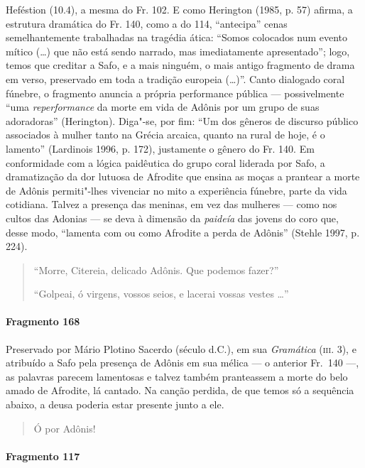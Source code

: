 {Heféstion (10.4), a mesma do Fr. 102. E como Herington (1985, p. 57) afirma, a estrutura dramática do Fr. 140,  como a do 114, “antecipa” cenas semelhantemente trabalhadas na tragédia ática: “Somos colocados num evento mítico (\ldots{}) que não está sendo narrado, mas imediatamente apresentado”; logo,  temos que creditar a Safo, e a mais ninguém, o mais antigo fragmento de drama em verso, preservado em toda a tradição europeia (\ldots{})”. Canto dialogado coral fúnebre, o fragmento anuncia a própria performance pública --- possivelmente “uma \textit{reperformance} da morte em vida de Adônis por um grupo de suas adoradoras” (Herington). Diga"-se, por fim: “Um dos gêneros de discurso público associados à mulher tanto na Grécia arcaica, quanto na rural de hoje, é o lamento” (Lardinois 1996, p. 172), justamente o gênero do Fr. 140. Em conformidade com a lógica paidêutica do grupo coral liderada por Safo, a dramatização da dor lutuosa de Afrodite que ensina as moças a prantear a morte de Adônis permiti"-lhes vivenciar no mito a experiência fúnebre, parte da vida cotidiana. Talvez a presença das meninas, em vez das mulheres --- como nos cultos das Adonias --- se deva à dimensão da \textit{paideía} das jovens do coro que, desse modo, “lamenta com ou como Afrodite a perda de Adônis” (Stehle 1997, p. 224). }

\begin{verse}
“Morre, Citereia, delicado Adônis. Que podemos \qb{}fazer?”

“Golpeai, ó virgens, vossos seios, e lacerai vossas \qb{}vestes \ldots{}”
\end{verse}

\paragraph{Fragmento 168}

{\small Preservado por Mário Plotino Sacerdo (século  d.C.), em sua
\emph{Gramática} (\textsc{iii}. 3), e atribuído a Safo pela presença de Adônis em
sua mélica --- o anterior Fr.~140 ---, as palavras parecem lamentosas e
talvez também pranteassem a morte do belo amado de Afrodite, lá cantado. Na canção perdida, de que temos só a sequência abaixo, a deusa poderia estar presente junto a ele.}

\begin{verse}
Ó por Adônis!
\end{verse}

\paragraph{Fragmento 117}

